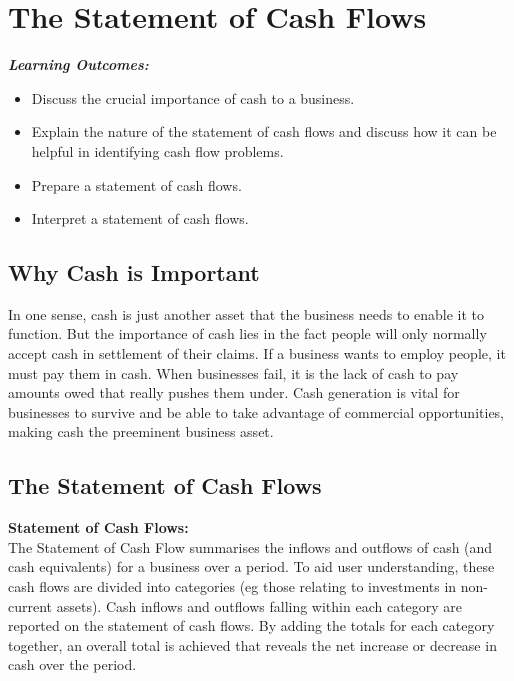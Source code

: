 \documentclass{report}
\newenvironment{blackbox}[1][Black]
  {\begin{tcolorbox}[colframe=#1,colback=white]}
  {\end{tcolorbox}}
\begin{document}
\chapter{The Statement of Cash Flows}
\begin{blackbox}
    \textit{\textbf{Learning Outcomes:}}
    \begin{itemize}
        \item Discuss the crucial importance of cash to a business.
        \item Explain the nature of the statement of cash flows and discuss how it can be helpful in identifying cash flow problems.
        \item Prepare a statement of cash flows.
        \item Interpret a statement of cash flows.
    \end{itemize}
\end{blackbox}

\section{Why Cash is Important}

In one sense, cash is just another asset that the business needs to enable it to function. But the importance of cash lies in the fact people will only normally accept cash in settlement of their claims. If a business wants to employ people, it must pay them in cash. When businesses fail, it is the lack of cash to pay amounts owed that really pushes them under. Cash generation is vital for businesses to survive and be able to take advantage of commercial opportunities, making cash the preeminent business asset.\\

\section{The Statement of Cash Flows}

\begin{blackbox}
    \textbf{Statement of Cash Flows:}\\
    The Statement of Cash Flow summarises the inflows and outflows of cash (and cash equivalents) for a business over a period. To aid user understanding, these cash flows are divided into categories (eg those relating to investments in non-current assets). Cash inflows and outflows falling within each category are reported on the statement of cash flows. By adding the totals for each category together, an overall total is achieved that reveals the net increase or decrease in cash over the period.
\end{blackbox}
\end{document}
